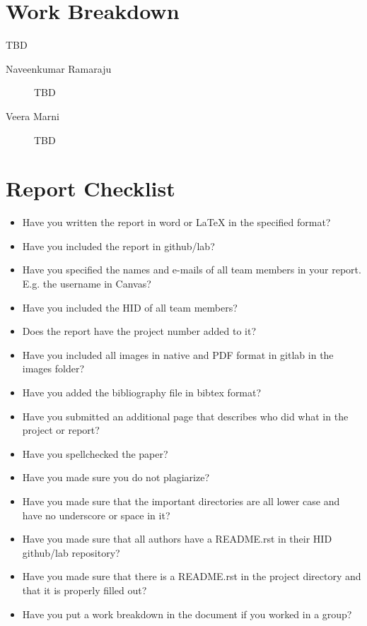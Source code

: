 \documentclass[9pt,twocolumn,twoside]{../../styles/osajnl}
\begin{document}
\endgroup

\newpage

\appendix

\section{Work Breakdown}

TBD

\begin{description}

\item[Naveenkumar Ramaraju] TBD

\item[Veera Marni] TBD


\end{description}

\section{Report Checklist}

\begin{itemize}
\renewcommand{\labelitemi}{\scriptsize$\square$} 
\item Have you written the report in word or LaTeX in the specified
  format?
\item Have you included the report in github/lab?
\item Have you specified the names and e-mails of all team members in
  your report. E.g. the username in Canvas?
\item Have you included the HID of all team members?
\item Does the report have the project number added to it?
\item Have you included all images in native and PDF format in gitlab
  in the images folder?
\item Have you added the bibliography file in bibtex format?
\item Have you submitted an additional page that describes who did
  what in the project or report?
\item Have you spellchecked the paper?
\item Have you made sure you do not plagiarize?
\item Have you made sure that the important directories are all lower
  case and have no underscore or space in it?
\item Have you made sure that all authors have a README.rst in their
  HID github/lab repository?
\item Have you made sure that there is a README.rst in the project
  directory and that it is properly filled out?
\item Have you put a work breakdown in the document if you worked in a
  group?
\end{itemize}
\end{document}
